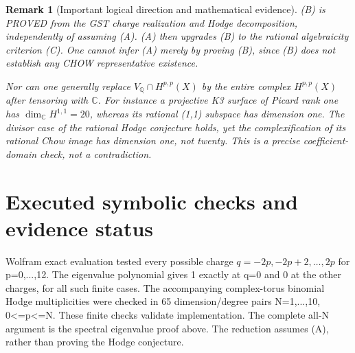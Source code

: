 \documentclass[11pt]{article}
\newcommand{\Q}{\mathbb Q}
\newcommand{\C}{\mathbb C}
\newtheorem{remark}[theorem]{Remark}
\begin{document}
\begin{remark}[Important logical direction and mathematical evidence]
(B) is PROVED from the GST charge realization and
Hodge decomposition, independently of assuming (A).
(A) then upgrades (B) to the rational
algebraicity criterion (C). One cannot infer
(A) merely by proving (B), since (B) does not
establish any CHOW representative existence.

Nor can one generally replace
\(V_{\Q}\cap H^{p,p}(X)\) by the entire complex
\(H^{p,p}(X)\) after tensoring with \(\C\).
For instance a projective K3 surface of
Picard rank one has
\(\dim_{\C}H^{1,1}=20\), whereas its rational
(1,1) subspace has dimension one.
The divisor case of the rational Hodge
conjecture holds, yet the complexification
of its rational Chow image has dimension
one, not twenty. This is a precise
coefficient-domain check, not a contradiction.
\end{remark}

\section{Executed symbolic checks and evidence status}
Wolfram exact evaluation tested every possible
charge \(q=-2p,-2p+2,\ldots,2p\) for
p=0,...,12. The eigenvalue polynomial gives
1 exactly at q=0 and 0 at the other charges,
for all such finite cases. The accompanying
complex-torus binomial Hodge multiplicities
were checked in 65 dimension/degree pairs
N=1,...,10, 0<=p<=N.
These finite checks validate implementation.
The complete all-N argument is the spectral
eigenvalue proof above. The reduction assumes
(A), rather than proving the Hodge conjecture.
\end{document}
